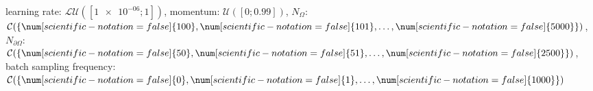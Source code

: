 learning rate: $\mathcal{LU}([\num[scientific-notation=true]{1e-06}; \num[scientific-notation=false]{1}])$, momentum: $\mathcal{U}([\num[scientific-notation=false]{0}; \num[scientific-notation=true]{0.99}])$, $N_{\Omega}$: $\mathcal{C}(\{\num[scientific-notation=false]{100},\num[scientific-notation=false]{101},\text{\dots},\num[scientific-notation=false]{5000}\})$, $N_{\partial\Omega}$: $\mathcal{C}(\{\num[scientific-notation=false]{50},\num[scientific-notation=false]{51},\text{\dots},\num[scientific-notation=false]{2500}\})$, batch sampling frequency: $\mathcal{C}(\{\num[scientific-notation=false]{0},\num[scientific-notation=false]{1},\text{\dots},\num[scientific-notation=false]{1000}\})$